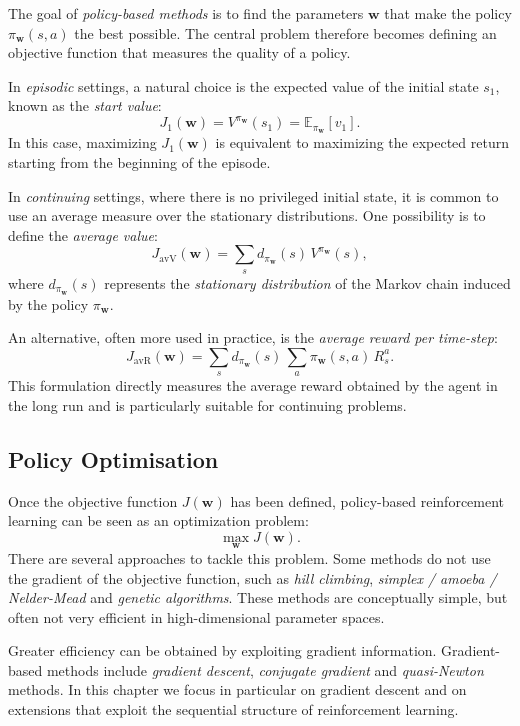 The goal of \emph{policy-based methods} is to find the parameters $\mathbf{w}$ that make the policy $\pi_{\mathbf{w}}(s,a)$ the best possible. The central problem therefore becomes defining an objective function that measures the quality of a policy.

In \emph{episodic} settings, a natural choice is the expected value of the initial state $s_1$, known as the \emph{start value}:
\[
J_1(\mathbf{w}) = V^{\pi_{\mathbf{w}}}(s_1) = \mathbb{E}_{\pi_{\mathbf{w}}}[v_1].
\]
In this case, maximizing $J_1(\mathbf{w})$ is equivalent to maximizing the expected return starting from the beginning of the episode.

In \emph{continuing} settings, where there is no privileged initial state, it is common to use an average measure over the stationary distributions. One possibility is to define the \emph{average value}:
\[
J_{\text{avV}}(\mathbf{w}) =
\sum_s d_{\pi_{\mathbf{w}}}(s)\, V^{\pi_{\mathbf{w}}}(s),
\]
where $d_{\pi_{\mathbf{w}}}(s)$ represents the \emph{stationary distribution} of the Markov chain induced by the policy $\pi_{\mathbf{w}}$.

An alternative, often more used in practice, is the \emph{average reward per time-step}:
\[
J_{\text{avR}}(\mathbf{w}) =
\sum_s d_{\pi_{\mathbf{w}}}(s)\,
\sum_a \pi_{\mathbf{w}}(s,a)\, R_s^a.
\]
This formulation directly measures the average reward obtained by the agent in the long run and is particularly suitable for continuing problems.

\subsection{Policy Optimisation}

Once the objective function $J(\mathbf{w})$ has been defined, policy-based reinforcement learning can be seen as an optimization problem:
\[
\max_{\mathbf{w}} J(\mathbf{w}).
\]
There are several approaches to tackle this problem. Some methods do not use the gradient of the objective function, such as \emph{hill climbing}, \emph{simplex / amoeba / Nelder-Mead} and \emph{genetic algorithms}. These methods are conceptually simple, but often not very efficient in high-dimensional parameter spaces.

Greater efficiency can be obtained by exploiting gradient information. Gradient-based methods include \emph{gradient descent}, \emph{conjugate gradient} and \emph{quasi-Newton} methods. In this chapter we focus in particular on gradient descent and on extensions that exploit the sequential structure of reinforcement learning.

